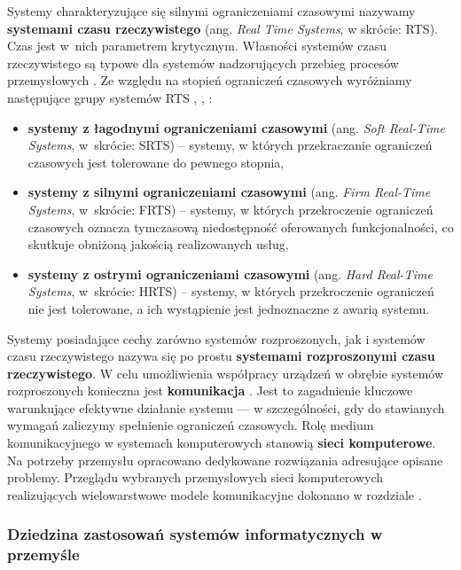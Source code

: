 \documentclass[a4paper, 12pt, twoside]{article}
\begin{document}
Systemy charakteryzujące się silnymi ograniczeniami czasowymi nazywamy 
\textbf{systemami czasu rzeczywistego} (ang. \emph{Real Time Systems}, w skrócie: RTS). 
Czas jest w~nich parametrem krytycznym. 
Własności systemów czasu rzeczywistego są typowe dla systemów
nadzorujących przebieg procesów przemysłowych \cite{isp-analiza-przepływu-informacji}.
Ze względu na stopień ograniczeń czasowych wyróżniamy następujące grupy systemów RTS 
\cite{isp}, \cite{isp-analiza-przepływu-informacji}, \cite{iiot-cyber-manufacturing-systems}:
\begin{itemize}
    \item \textbf{systemy z łagodnymi ograniczeniami czasowymi} (ang. \emph{Soft Real-Time Systems}, w~skrócie: SRTS)
     -- systemy, w których przekraczanie ograniczeń czasowych jest tolerowane do pewnego stopnia,
    \item \textbf{systemy z silnymi ograniczeniami czasowymi} (ang. \emph{Firm Real-Time Systems}, w~skrócie: FRTS)
     -- systemy, w których przekroczenie ograniczeń czasowych oznacza tymczasową
     niedostępność oferowanych funkcjonalności, co skutkuje obniżoną jakością realizowanych usług,
    \item \textbf{systemy z ostrymi ograniczeniami czasowymi} (ang. \emph{Hard Real-Time Systems}, w~skrócie: HRTS)
     -- systemy, w których przekroczenie ograniczeń nie jest tolerowane, a ich 
     wystąpienie jest jednoznaczne z awarią systemu. 
\end{itemize}

Systemy posiadające cechy zarówno systemów rozproszonych, jak i systemów
czasu rzeczywistego nazywa się po prostu \textbf{systemami rozproszonymi czasu rzeczywistego}.
W celu umożliwienia współpracy urządzeń w obrębie systemów rozproszonych konieczna
jest \textbf{komunikacja} \cite{isp-analiza-przepływu-informacji}. Jest to zagadnienie kluczowe warunkujące efektywne działanie
systemu --- w szczególności, gdy do stawianych wymagań zaliczymy spełnienie 
ograniczeń czasowych. Rolę medium komunikacyjnego
w systemach komputerowych stanowią \textbf{sieci komputerowe}. Na potrzeby 
przemysłu opracowano dedykowane rozwiązania adresujące opisane problemy.
Przeglądu wybranych przemysłowych sieci komputerowych realizujących wielowarstwowe
modele komunikacyjne dokonano w rozdziale .

\subsubsection{Dziedzina zastosowań systemów informatycznych w przemyśle}
\end{document}
